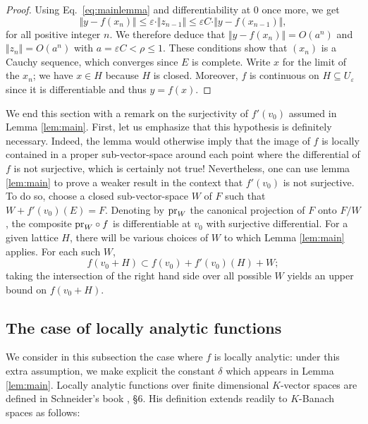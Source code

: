 \documentclass{lms}
\begin{document}
\begin{proof}
Using Eq.~\eqref{eq:mainlemma} and differentiability at $0$ once more,
we get
$$\Vert y  - f(x_n) \Vert 
\leq \varepsilon \cdot \Vert z_{n-1} \Vert \leq \varepsilon C \cdot \Vert 
y - f(x_{n-1}) \Vert,$$
for all positive integer $n$.  We therefore deduce that $\Vert y - f(x_n) \Vert = O(a^n)$ and 
$\Vert z_n \Vert = O(a^n)$ with $a = \varepsilon C < \rho \leq 1$. 
These conditions show that $(x_n)$ is a Cauchy sequence, which converges since $E$ is complete.
Write $x$ for the limit of the $x_n$; we have $x \in H$ because $H$ is closed.
Moreover, $f$ is continuous on $H \subseteq U_\varepsilon$ since it is differentiable and thus $y=f(x)$.
\end{proof}

We end this section with a remark on the surjectivity of $f'(v_0)$ assumed in
Lemma \ref{lem:main}. First, let us 
emphasize that this hypothesis is definitely necessary. Indeed, the lemma would 
otherwise imply that the image of $f$ is locally contained in a proper 
sub-vector-space around each point where the differential of $f$ is not 
surjective, which is certainly not true! Nevertheless, one can use lemma \ref{lem:main}
to prove a weaker result in the context that $f'(v_0)$ is not surjective.
To do so, choose a closed sub-vector-space $W$ of $F$ such that $W + f'(v_0)(E) = 
F$. Denoting by $\text{\rm pr}_W$ the canonical projection of $F$ onto 
$F/W$, the composite $\text{\rm pr}_W \circ f$ is differentiable at 
$v_0$ with surjective differential. For a given lattice $H$, there will be various choices of $W$ to which Lemma \ref{lem:main}
applies.  For each such $W$,
\begin{equation}
\label{eq:notsurjective}
f(v_0 + H) \subset f(v_0) + f'(v_0)(H) + W;
\end{equation}
taking the intersection of the right hand side
over all possible $W$ yields an upper bound on $f(v_0 + H)$.

\subsection{The case of locally analytic functions}
\label{ssec:locanalytic}

We consider in this subsection the case where $f$ is locally analytic: 
under this extra assumption, we make explicit the constant $\delta$ 
which appears in Lemma \ref{lem:main}.
Locally analytic functions over finite dimensional $K$-vector spaces are 
defined in Schneider's book \cite {schneider:11a}, \S 6. His definition 
extends readily to $K$-Banach spaces as follows:
\end{document}
